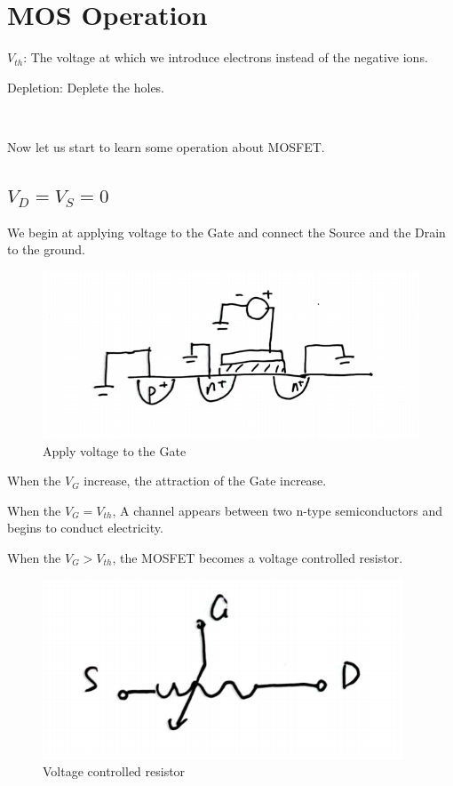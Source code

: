 \documentclass[fontset=windows]{article}
\begin{document}
\section*{MOS Operation}

$V_{th}$: The voltage at which we introduce electrons instead of the negative ions.

Depletion: Deplete the holes.

\

Now let us start to learn some operation about MOSFET.

\subsection*{$V_D=V_S=0$}

We begin at applying voltage to the Gate and connect the Source and the Drain to the ground.

\begin{figure}[htbp]
    \centering
    \includegraphics[scale=0.6]{3.jpg}
    \captionsetup{labelformat=empty}
    \caption{Apply voltage to the Gate}
    \label{3}
\end{figure}

When the $V_G$ increase, the attraction of the Gate increase.

When the $V_G=V_{th}$, A channel appears between two n-type semiconductors and begins to conduct electricity.

When the $V_G>V_{th}$, the MOSFET becomes a voltage controlled resistor.

\begin{figure}[htbp]
    \centering
    \includegraphics[scale=0.6]{4.jpg}
    \captionsetup{labelformat=empty}
    \caption{Voltage controlled resistor}
    \label{4}
\end{figure}
\end{document}
